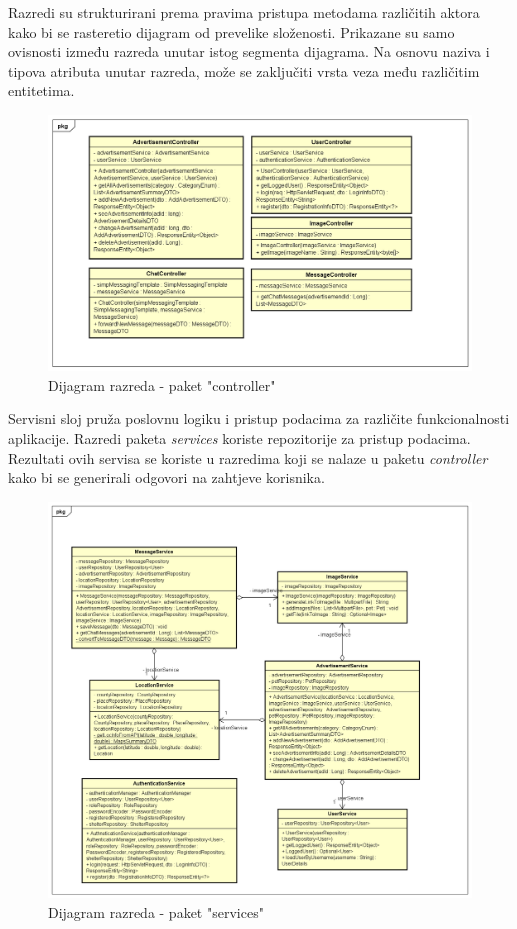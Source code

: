 Razredi su strukturirani prema pravima pristupa metodama            različitih aktora kako bi se rasteretio dijagram od prevelike       složenosti. Prikazane su samo ovisnosti između razreda unutar       istog segmenta dijagrama. Na osnovu naziva i tipova atributa        unutar razreda, može se zaključiti vrsta veza među različitim       entitetima.

\begin{figure}[htb]
	\centering
	\includegraphics[width=\textwidth]{slike/dr1_kontroleri.png}
	\caption{Dijagram razreda - paket "controller"}
\end{figure}
\pagebreak

Servisni sloj pruža poslovnu logiku i pristup podacima za različite funkcionalnosti aplikacije. Razredi paketa \textit{services} koriste repozitorije za pristup podacima. Rezultati ovih servisa se koriste u razredima koji se nalaze u paketu \textit{controller} kako bi se generirali odgovori na zahtjeve korisnika.

\begin{figure}[htb]
	\centering
	\includegraphics[width=\textwidth]{slike/dr2_servisi.png}
	\caption{Dijagram razreda - paket "services"}
\end{figure}
\pagebreak

